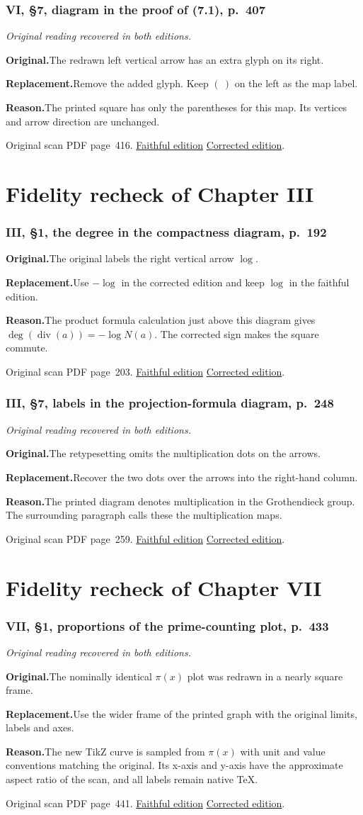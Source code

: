 \documentclass[11pt,a4paper]{article}
\newcommand{\original}{\par\smallskip\noindent\textbf{Original.}\enspace}
\newcommand{\replacement}{\par\smallskip\noindent\textbf{Replacement.}\enspace}
\newcommand{\reason}{\par\smallskip\noindent\textbf{Reason.}\enspace}
\newcommand{\editionlink}[3]{\href{#1\#errata.#2}{#3}}
\newcommand{\location}[2]{%
  \par\smallskip\noindent Original scan PDF page~#2.\enspace
  \editionlink{Neukirch_Faithful.pdf}{#1}{Faithful edition}
  \quad\editionlink{Neukirch_Corrected.pdf}{#1}{Corrected edition}.}
\begin{document}
\section{VI, \S7, diagram in the proof of (7.1), p.~407}\label{errata:item:198}
\noindent\emph{Original reading recovered in both editions.}\par
\original The redrawn left vertical arrow has an extra glyph on its right.
\replacement Remove the added glyph. Keep $(\ )$ on the left as the map label.
\reason The printed square has only the parentheses for this map. Its vertices and arrow direction are unchanged.
\location{198}{416}

\part{Fidelity recheck of Chapter III}
\setcounter{section}{202}
\section{III, \S1, the degree in the compactness diagram, p.~192}\label{errata:item:203}

\original The original labels the right vertical arrow $\log$.
\replacement Use $-\log$ in the corrected edition and keep $\log$ in the faithful edition.
\reason The product formula calculation just above this diagram gives $\deg(\operatorname{div}(a))=-\log N(a)$. The corrected sign makes the square commute.
\location{203}{203}

\setcounter{section}{203}
\section{III, \S7, labels in the projection-formula diagram, p.~248}\label{errata:item:204}
\noindent\emph{Original reading recovered in both editions.}\par
\original The retypesetting omits the multiplication dots on the arrows.
\replacement Recover the two dots over the arrows into the right-hand column.
\reason The printed diagram denotes multiplication in the Grothendieck group. The surrounding paragraph calls these the multiplication maps.
\location{204}{259}

\part{Fidelity recheck of Chapter VII}
\setcounter{section}{204}
\section{VII, \S1, proportions of the prime-counting plot, p.~433}\label{errata:item:205}
\noindent\emph{Original reading recovered in both editions.}\par
\original The nominally identical $\pi(x)$ plot was redrawn in a nearly square frame.
\replacement Use the wider frame of the printed graph with the original limits, labels and axes.
\reason The new TikZ curve is sampled from $\pi(x)$ with unit and value conventions matching the original. Its x-axis and y-axis have the approximate aspect ratio of the scan, and all labels remain native TeX.
\location{205}{441}
\end{document}
